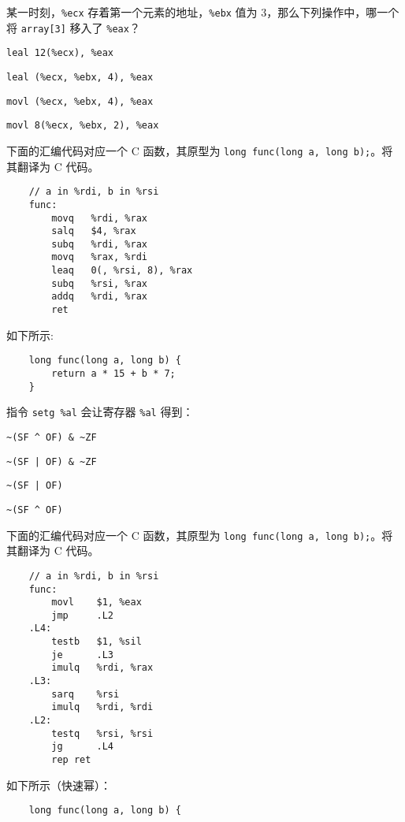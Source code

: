 \begin{problems}
        某一时刻，\verb|%ecx| 存着第一个元素的地址，\verb|%ebx| 值为 3，那么下列操作中，哪一个将 \verb|array[3]| 移入了 \verb|%eax|？
        \begin{choices}
            \item \verb|leal 12(%ecx), %eax|
            \item \verb|leal (%ecx, %ebx, 4), %eax|
            \item \verb|movl (%ecx, %ebx, 4), %eax|
            \item \verb|movl 8(%ecx, %ebx, 2), %eax|
        \end{choices}
        \pro 下面的汇编代码对应一个 C 函数，其原型为 \verb|long func(long a, long b);|。将其翻译为 C 代码。
        \begin{verbatim}
    // a in %rdi, b in %rsi
    func:
        movq   %rdi, %rax
        salq   $4, %rax
        subq   %rdi, %rax
        movq   %rax, %rdi
        leaq   0(, %rsi, 8), %rax
        subq   %rsi, %rax
        addq   %rdi, %rax
        ret
        \end{verbatim}
        \sol 如下所示:
        \begin{verbatim}
    long func(long a, long b) {
        return a * 15 + b * 7;
    }
        \end{verbatim}
        \pro 指令 \verb|setg %al| 会让寄存器 \verb|%al| 得到：
        \begin{choices}
            \item \verb+~(SF ^ OF) & ~ZF+
            \item \verb+~(SF | OF) & ~ZF+
            \item \verb+~(SF | OF)+
            \item \verb+~(SF ^ OF)+
        \end{choices}
        \pro 下面的汇编代码对应一个 C 函数，其原型为 \verb|long func(long a, long b);|。将其翻译为 C 代码。
        \begin{verbatim}
    // a in %rdi, b in %rsi
    func: 
        movl    $1, %eax
        jmp     .L2
    .L4: 
        testb   $1, %sil
        je      .L3
        imulq   %rdi, %rax
    .L3: 
        sarq    %rsi
        imulq   %rdi, %rdi
    .L2: 
        testq   %rsi, %rsi
        jg      .L4
        rep ret 
        \end{verbatim}
        \sol 如下所示（快速幂）：
        \begin{verbatim}
    long func(long a, long b) {

\end{verbatim}
\end{problems}
